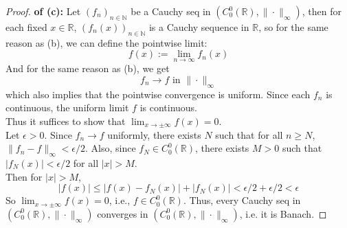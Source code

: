 \documentclass[lang=cn,11pt]{elegantbook}
\begin{document}
\begin{proof}
    \textbf{of (c):}
    Let \((f_n)_{n\in \mathbb{N}}\) be a Cauchy seq in \((C^0_0(\mathbb{R}), \|\cdot\|_\infty)\), then for each fixed \(x \in \mathbb{R}\), \((f_n(x))_{n\in\mathbb{N}}\) is a Cauchy sequence in \(\mathbb{R}\), so for the same reason as (b), we can define the pointwise limit: \[
f(x) := \lim_{n \to \infty} f_n(x)
\]And for the same reason as (b), we get  \[
f_n \to f \text{ in }\|\cdot\|_\infty
\]
which also implies that the pointwise convergence is uniform. Since each $f_n$ is continuous, the uniform limit $f$ is continuous.\\
Thus it suffices to show that $\lim_{x\to\pm\infty} f(x) =0$.\\
Let \(\epsilon > 0\). Since \(f_n \to f\) uniformly, there exists \(N\) such that for all \(n \ge N\), \(\|f_n - f\|_\infty < \epsilon/2\). Also, since \(f_N \in C^0_0(\mathbb{R})\), there exists \(M > 0\) such that \(|f_N(x)| < \epsilon/2\) for all \(|x| > M\).\\
Then for \(|x| > M\), \[
|f(x)| \le |f(x) - f_N(x)| + |f_N(x)| < \epsilon/2+ \epsilon/2 < \epsilon
\]
So \(\lim_{x\to\pm\infty} f(x) = 0\), i.e., \(f \in C^0_0(\mathbb{R})\). Thus, every Cauchy seq in \((C^0_0(\mathbb{R}), \|\cdot\|_\infty)\) converges in \((C^0_0(\mathbb{R}), \|\cdot\|_\infty)\), i.e. it is Banach.
\end{proof}
\end{document}
